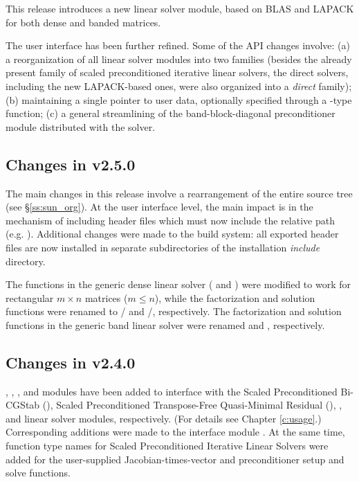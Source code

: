 This release introduces a new linear solver module, based on BLAS and LAPACK
for both dense and banded matrices.

The user interface has been further refined. Some of the API changes involve:
(a) a reorganization of all linear solver modules into two families (besides 
the already present family of scaled preconditioned iterative linear solvers,
the direct solvers, including the new LAPACK-based ones, were also organized 
into a {\em direct} family); (b) maintaining a single pointer to user data,
optionally specified through a -type function; (c) a general 
streamlining of the band-block-diagonal preconditioner module distributed 
with the solver.

\subsection*{Changes in v2.5.0}

The main changes in this release involve a rearrangement of the entire 
{\sundials} source tree (see \S\ref{ss:sun_org}). At the user interface 
level, the main impact is in the mechanism of including {\sundials} header
files which must now include the relative path (e.g. ).
Additional changes were made to the build system: all exported header files are
now installed in separate subdirectories of the installation {\em include} directory.

The functions in the generic dense linear solver ( and
) were modified to work for rectangular $m \times n$
matrices ($m \le n$), while the factorization and solution functions were
renamed to / and /, 
respectively.
The factorization and solution functions in the generic band linear solver were 
renamed  and , respectively.

\subsection*{Changes in v2.4.0}

{\kinspbcg}, {\kinsptfqmr}, {\kindense}, and {\kinband} modules have been
added to interface with the Scaled Preconditioned Bi-CGStab ({\spbcg}),
Scaled Preconditioned Transpose-Free Quasi-Minimal Residual ({\sptfqmr}),
{\dense}, and {\band} linear solver modules, respectively.  (For details
see Chapter \ref{c:usage}.) Corresponding additions were made to the {\F}
interface module {\fkinsol}. At the same time, function type names for
Scaled Preconditioned Iterative Linear Solvers were added for the
user-supplied Jacobian-times-vector and preconditioner setup and solve
functions.

